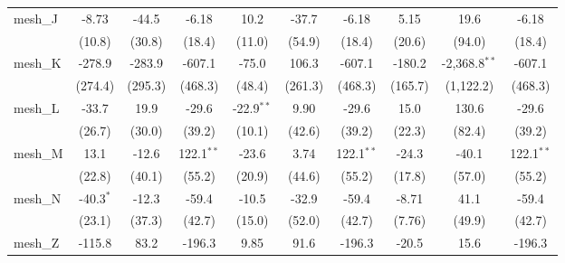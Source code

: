 \begin{tabular}{lccccccccc}
   mesh\_J                                                     & -8.73          & -44.5           & -6.18          & 10.2          & -37.7         & -6.18          & 5.15          & 19.6            & -6.18\\   
                                                               & (10.8)         & (30.8)          & (18.4)         & (11.0)        & (54.9)        & (18.4)         & (20.6)        & (94.0)          & (18.4)\\   
   mesh\_K                                                     & -278.9         & -283.9          & -607.1         & -75.0         & 106.3         & -607.1         & -180.2        & -2,368.8$^{**}$ & -607.1\\   
                                                               & (274.4)        & (295.3)         & (468.3)        & (48.4)        & (261.3)       & (468.3)        & (165.7)       & (1,122.2)       & (468.3)\\   
   mesh\_L                                                     & -33.7          & 19.9            & -29.6          & -22.9$^{**}$  & 9.90          & -29.6          & 15.0          & 130.6           & -29.6\\   
                                                               & (26.7)         & (30.0)          & (39.2)         & (10.1)        & (42.6)        & (39.2)         & (22.3)        & (82.4)          & (39.2)\\   
   mesh\_M                                                     & 13.1           & -12.6           & 122.1$^{**}$   & -23.6         & 3.74          & 122.1$^{**}$   & -24.3         & -40.1           & 122.1$^{**}$\\   
                                                               & (22.8)         & (40.1)          & (55.2)         & (20.9)        & (44.6)        & (55.2)         & (17.8)        & (57.0)          & (55.2)\\   
   mesh\_N                                                     & -40.3$^{*}$    & -12.3           & -59.4          & -10.5         & -32.9         & -59.4          & -8.71         & 41.1            & -59.4\\   
                                                               & (23.1)         & (37.3)          & (42.7)         & (15.0)        & (52.0)        & (42.7)         & (7.76)        & (49.9)          & (42.7)\\   
   mesh\_Z                                                     & -115.8         & 83.2            & -196.3         & 9.85          & 91.6          & -196.3         & -20.5         & 15.6            & -196.3\\   

\end{tabular}
